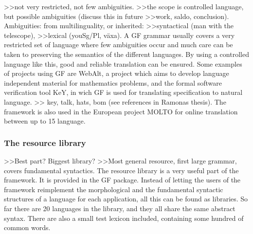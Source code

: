 \documentclass{report}
\begin{document}
>>not very restricted, not few ambiguities.
>>the scope is controlled language, but possible ambiguities (discuss this in future
>>work, saldo, conclusion). Ambiguities: from multilinguality, or inherited:
>>syntactical (man with the telescope), 
>>lexical (youSg/Pl, växa).
A GF grammar usually covers a very restricted set of language where few ambiguities
occur and much care can be taken to preserving the semantics of the
different languages.
By using a controlled language like this,  good and reliable translation can be
ensured. Some examples of projects using GF are WebAlt\cite{webalt},
a project which aims to develop language independent material for mathematics problems,
and the formal software verification tool KeY\cite{key}, in wich GF is used for translating specification
to natural language.
>> key, talk, hats, bom (see references in Ramonas thesis).
The framework is also used in the
European project MOLTO\cite{molto} for online translation between up to 15 language.\\

\subsubsection{The resource library}
>>Best part? Biggest library?
>>Most general resource, first large grammar, covers fundamental syntactics.
The resource library\cite{gf-resource} is a very useful part of the framework. It is provided in the 
GF package. %
Instead of letting the users of the framework reimplement the morphological and
the fundamental syntactic structures of a language for each application, all
this can be found as libraries. So far there are 20 languages in the library, and
they all share the same abstract syntax.
There are also a small test lexicon included, containing some hundred of common words.
\end{document}
